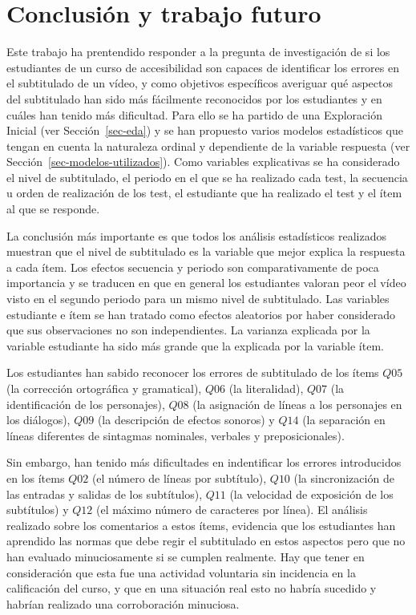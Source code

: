 \documentclass[
  12pt,
  a4paper,
  extrafontsizes,
  onecolumn,
  openright,
  table]{memoir}
\begin{document}
\color{black}
\normalsize


\hypertarget{sec-conclusion}{%
\chapter{Conclusión y trabajo futuro}\label{sec-conclusion}}

Este trabajo ha prentendido responder a la pregunta de investigación de
si los estudiantes de un curso de \gls{accesibilidad} son capaces de
identificar los errores en el subtitulado de un vídeo, y como objetivos
específicos averiguar qué aspectos del subtitulado han sido más
fácilmente reconocidos por los estudiantes y en cuáles han tenido más
dificultad. Para ello se ha partido de una Exploración Inicial (ver
Sección~\ref{sec-eda}) y se han propuesto varios modelos estadísticos
que tengan en cuenta la naturaleza ordinal y dependiente de la variable
respuesta (ver Sección~\ref{sec-modelos-utilizados}). Como variables
explicativas se ha considerado el nivel de subtitulado, el periodo en el
que se ha realizado cada test, la secuencia u orden de realización de
los test, el estudiante que ha realizado el test y el ítem al que se
responde.

La conclusión más importante es que todos los análisis estadísticos
realizados muestran que el nivel de subtitulado es la variable que mejor
explica la respuesta a cada ítem. Los efectos secuencia y periodo son
comparativamente de poca importancia y se traducen en que en general los
estudiantes valoran peor el vídeo visto en el segundo periodo para un
mismo nivel de subtitulado. Las variables estudiante e ítem se han
tratado como efectos aleatorios por haber considerado que sus
observaciones no son independientes. La varianza explicada por la
variable estudiante ha sido más grande que la explicada por la variable
ítem.

Los estudiantes han sabido reconocer los errores de subtitulado de los
ítems \(Q05\) (la corrección ortográfica y gramatical), \(Q06\) (la
literalidad), \(Q07\) (la identificación de los personajes), \(Q08\) (la
asignación de líneas a los personajes en los diálogos), \(Q09\) (la
descripción de efectos sonoros) y \(Q14\) (la separación en líneas
diferentes de sintagmas nominales, verbales y preposicionales).

Sin embargo, han tenido más dificultades en indentificar los errores
introducidos en los ítems \(Q02\) (el número de líneas por subtítulo),
\(Q10\) (la sincronización de las entradas y salidas de los subtítulos),
\(Q11\) (la velocidad de exposición de los subtítulos) y \(Q12\) (el
máximo número de caracteres por línea). El análisis realizado sobre los
comentarios a estos ítems, evidencia que los estudiantes han aprendido
las normas que debe regir el subtitulado en estos aspectos pero que no
han evaluado minuciosamente si se cumplen realmente. Hay que tener en
consideración que esta fue una actividad voluntaria sin incidencia en la
calificación del curso, y que en una situación real esto no habría
sucedido y habrían realizado una corroboración minuciosa.
\end{document}
